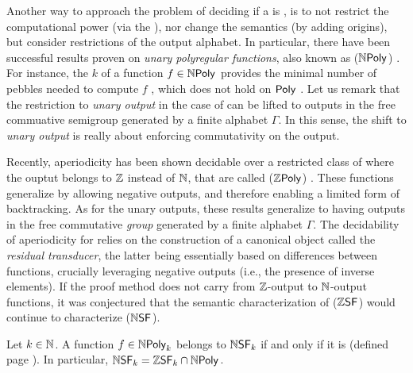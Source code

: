 Another way to approach the problem of deciding if a 
is , is to not restrict the computational power (via the
), nor change the semantics (by adding origins), but consider
restrictions of the output alphabet. In particular, there have been successful
results proven on \emph{unary polyregular functions}, also known as
 ($\NPoly$)
\cite{doueneau2021pebble,doueneau2022hiding}. For instance, the  $k$ of a function $f \in \NPoly$ provides the minimal number of pebbles
needed to compute $f$ \cite{doueneau2021pebble}, which does not hold on $\Poly$
\cite{bojanczyk2022transducers}. Let us remark that the restriction to
\emph{unary output} in the case of  can be lifted to
outputs in the free commuative semigroup generated by a finite alphabet
$\Gamma$. In this sense, the shift to \emph{unary output} is really about
enforcing commutativity on the output.

Recently, aperiodicity has been shown decidable over a restricted class of
 where the ouptut belongs to $\mathbb{Z}$ instead of
$\mathbb{N}$, that are called  ($\ZPoly$)
\cite{LOPEZ23b}. These functions generalize 
by allowing negative outputs, and therefore enabling a limited form of
backtracking. As for the unary outputs, these results generalize to
 having outputs in the free commutative \emph{group}
generated by a finite alphabet $\Gamma$. The decidability of aperiodicity for
 relies on the construction of a canonical
object called the \emph{residual transducer}, the latter being essentially
based on differences between functions, crucially leveraging negative outputs
(i.e., the presence of inverse elements). If the proof method does not carry
from $\mathbb{Z}$-output to $\mathbb{N}$-output functions, it was conjectured that the
semantic characterization of 
($\ZSF$) would continue to characterize  ($\NSF$). 

\begin{conjecture}
    \label{zsf-nsf:conjecture}
    Let $k \in \mathbb{N}$.
    A function $f \in \NPoly[k]$
    belongs to $\NSF[k]$ if and only if
    it is  (defined page ).
    In particular,
    $\NSF[k] = \ZSF[k] \cap \NPoly$.
\end{conjecture}

